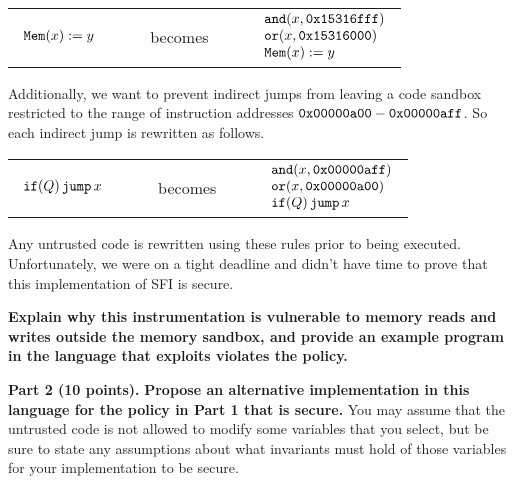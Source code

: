 \documentclass[10pt]{article}
\newcommand{\pand}[2]{\keywordfont{and}(#1, #2)}
\newcommand{\por}[2]{\keywordfont{or}(#1, #2)}
\begin{document}
\begin{enumerate}
\begin{center}
\begin{tabular}{lcl}
$
\begin{array}{l}
\texttt{\upshape Mem}(x) := y
\end{array}
$
&
\ \ \ \ becomes\ \ \ \ 
&
$
\begin{array}{l}
\pand{x}{\keywordfont{0x15316fff}} \\
\por{x}{\keywordfont{0x15316000}} \\
\pderef{x} := y
\end{array}
$
\end{tabular}
\end{center}
Additionally, we want to prevent indirect jumps from leaving a code sandbox restricted to the range of instruction addresses $\texttt{\upshape 0x00000a00} - \texttt{\upshape 0x00000aff}$. So each indirect jump is rewritten as follows.
\begin{center}
\begin{tabular}{lcl}
$
\begin{array}{l}
\texttt{\upshape if}(Q)\,\texttt{\upshape jump}\,x
\end{array}
$
&
\ \ \ \ becomes\ \ \ \ 
&
$
\begin{array}{l}
\pand{x}{\keywordfont{0x00000aff}} \\
\por{x}{\keywordfont{0x00000a00}} \\
\pifjump{\ivr}{x}
\end{array}
$
\end{tabular}
\end{center}
Any untrusted code is rewritten using these rules prior to being executed.
Unfortunately, we were on a tight deadline and didn't have time to prove that this implementation of SFI is secure. 

\textbf{Explain why this instrumentation is vulnerable to memory reads and writes outside the memory sandbox, and provide an example program in the language that exploits  violates the policy.}


%


\textbf{Part 2 (10 points).} \textbf{Propose an alternative implementation in this language for the policy in Part 1 that is secure.} You may assume that the untrusted code is not allowed to modify some variables that you select, but be sure to state any assumptions about what invariants must hold of those variables for your implementation to be secure.



\end{enumerate}
\end{document}
